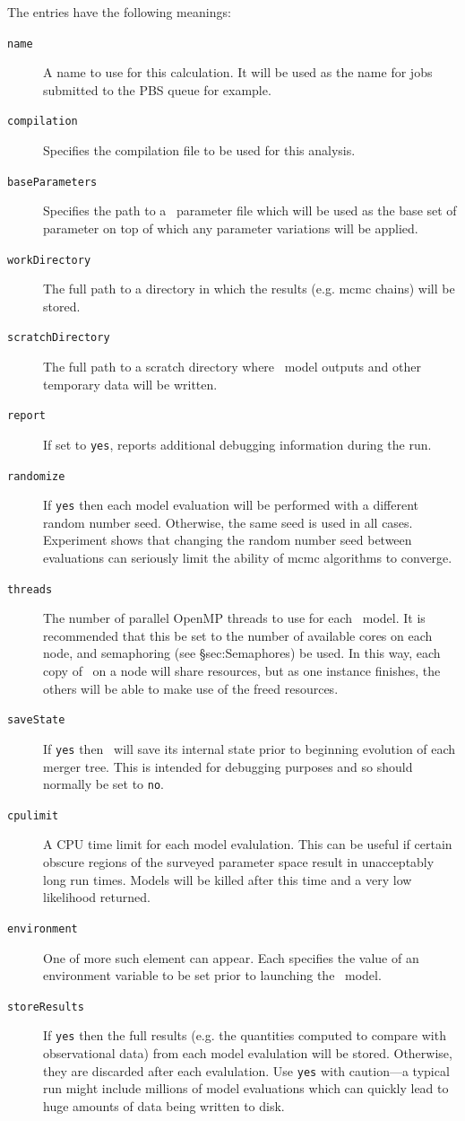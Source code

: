 The entries have the following meanings:
\begin{description}
\item[{\tt name}] A name to use for this calculation. It will be used as the name for jobs submitted to the PBS queue for example.
\item[{\tt compilation}] Specifies the compilation file to be used for this analysis.
\item[{\tt baseParameters}] Specifies the path to a \glc\ parameter file which will be used as the base set of parameter on top of which any parameter variations will be applied.
\item[{\tt workDirectory}] The full path to a directory in which the results (e.g. \gls{mcmc} chains) will be stored.
\item[{\tt scratchDirectory}] The full path to a scratch directory where \glc\ model outputs and other temporary data will be written.
\item[{\tt report}] If set to {\tt yes}, reports additional debugging information during the run.
\item[{\tt randomize}] If {\tt yes} then each model evaluation will be performed with a different random number seed. Otherwise, the same seed is used in all cases. Experiment shows that changing the random number seed between evaluations can seriously limit the ability of \gls{mcmc} algorithms to converge.
\item[{\tt threads}] The number of parallel OpenMP threads to use for each \glc\ model. It is recommended that this be set to the number of available cores on each node, and semaphoring (see \S{sec:Semaphores}) be used. In this way, each copy of \glc\ on a node will share resources, but as one instance finishes, the others will be able to make use of the freed resources.
\item[{\tt saveState}] If {\tt yes} then \glc\ will save its internal state prior to beginning evolution of each merger tree. This is intended for debugging purposes and so should normally be set to {\tt no}.
\item[{\tt cpulimit}] A CPU time limit for each model evalulation. This can be useful if certain obscure regions of the surveyed parameter space result in unacceptably long run times. Models will be killed after this time and a very low likelihood returned.
\item[{\tt environment}] One of more such element can appear. Each specifies the value of an environment variable to be set prior to launching the \glc\ model.
\item[{\tt storeResults}] If {\tt yes} then the full results (e.g. the quantities computed to compare with observational data) from each model evalulation will be stored. Otherwise, they are discarded after each evalulation. Use {\tt yes} with caution---a typical run might include millions of model evaluations which can quickly lead to huge amounts of data being written to disk.

\end{description}

